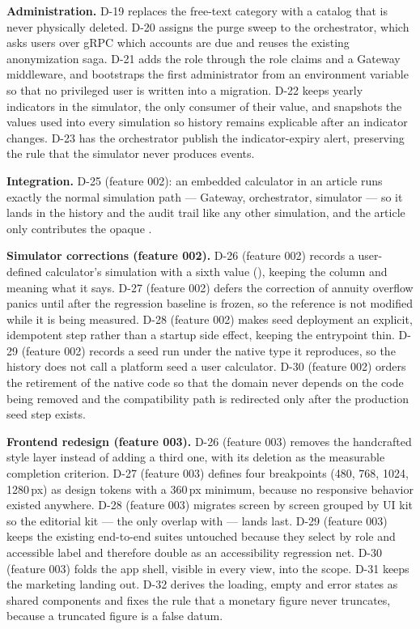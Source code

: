 \textbf{Administration.} D-19 replaces the free-text category with a catalog that
is never physically deleted. D-20 assigns the purge sweep to the orchestrator,
which asks users over gRPC which accounts are due and reuses the existing
anonymization saga. D-21 adds the  role through the role
claims and a Gateway middleware, and bootstraps the first administrator from an
environment variable so that no privileged user is written into a migration.
D-22 keeps yearly indicators in the simulator, the only consumer of their value,
and snapshots the values used into every simulation so history remains
explicable after an indicator changes. D-23 has the orchestrator publish the
indicator-expiry alert, preserving the rule that the simulator never produces
events.

\textbf{Integration.} D-25 (feature 002): an embedded calculator in an article runs exactly the
normal simulation path --- Gateway, orchestrator, simulator --- so it lands in
the history and the audit trail like any other simulation, and the article only
contributes the opaque .

\textbf{Simulator corrections (feature 002).} D-26 (feature 002) records a user-defined calculator's
simulation with a sixth  value (), keeping the
column  and meaning what it says. D-27 (feature 002) defers the correction of
annuity overflow panics until after the regression baseline is frozen, so the
reference is not modified while it is being measured. D-28 (feature 002) makes seed deployment
an explicit, idempotent step rather than a startup side effect, keeping the
entrypoint thin. D-29 (feature 002) records a seed run under the native type it reproduces,
so the history does not call a platform seed a user calculator. D-30 (feature 002) orders the
retirement of the native code so that the domain never depends on the code being
removed and the compatibility path is redirected only after the production seed
step exists.

\textbf{Frontend redesign (feature 003).} D-26 (feature 003) removes the handcrafted style layer instead of
adding a third one, with its deletion as the measurable completion criterion.
D-27 (feature 003) defines four breakpoints (480, 768, 1024, 1280\,px) as design tokens with a
360\,px minimum, because no responsive behavior existed anywhere. D-28 (feature 003) migrates
screen by screen grouped by UI kit so the editorial kit --- the only overlap with
 --- lands last. D-29 (feature 003) keeps the existing end-to-end suites untouched
because they select by role and accessible label and therefore double as an
accessibility regression net. D-30 (feature 003) folds the app shell, visible in every view,
into the scope. D-31 keeps the marketing landing out. D-32 derives the loading,
empty and error states as shared components and fixes the rule that a monetary
figure never truncates, because a truncated figure is a false datum.

